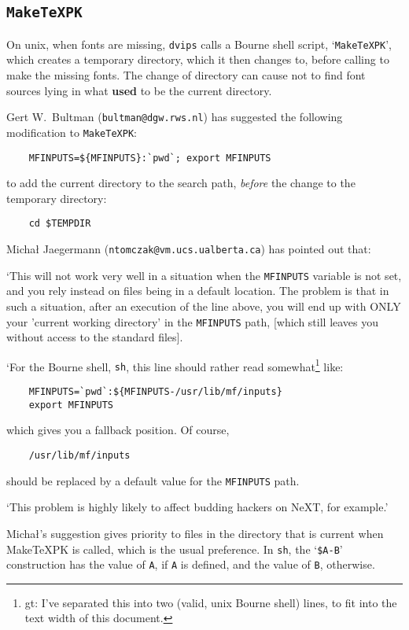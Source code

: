 \subsection{{\tt MakeTeXPK}}\label{sub:maketexpk}

On {\sc unix}, when fonts are missing,
{\tt dvips} calls a Bourne shell script, `{\tt MakeTeXPK}',
which creates a temporary directory, which it then changes to,
before calling \MF{} to make the missing fonts.
The change of directory can cause \MF{} not to find font sources
lying in what {\bf used} to be the current directory.

Gert W.~{\sc Bultman} ({\tt bultman@dgw.rws.nl}) has suggested the
following modification to {\tt MakeTeXPK\/}:
\begin{verbatim}
    MFINPUTS=${MFINPUTS}:`pwd`; export MFINPUTS
\end{verbatim}
to add the current directory to the search path, {\em before\/} the
change to the temporary directory:
\begin{verbatim}
    cd $TEMPDIR
\end{verbatim}

Micha{\l} {\sc Jaegermann} ({\tt ntomczak@vm.ucs.ualberta.ca})
has pointed out that:

`This will not work very well in a situation when the {\tt MFINPUTS} variable
is not set, and you rely instead on \MF{} files being in a default
location.  The problem is that in such a situation, after an execution
of the line above, you will end up with ONLY your 'current working
directory' in the {\tt MFINPUTS} path, [which still leaves you
without access to the standard \MF{} files].

`For the Bourne shell, {\tt sh}, this line should rather read
somewhat\footnote
{gt:  I've separated this into two (valid, unix Bourne shell) lines,
to fit into the text width of this document.}
like:
\begin{verbatim}
    MFINPUTS=`pwd`:${MFINPUTS-/usr/lib/mf/inputs}
    export MFINPUTS
\end{verbatim}
which gives you a fallback position.  Of course,
\begin{verbatim}
    /usr/lib/mf/inputs
\end{verbatim}
should be replaced by a default value for the {\tt MFINPUTS} path.

`This problem is highly likely to affect budding \MF{} hackers
on {\sf NeXT}, for example.'

Micha{\l}'s suggestion gives priority to \MF{} files in the directory that
is current when MakeTeXPK is called, which is the usual preference.
In {\tt sh}, the `{\tt \${A-B}}' construction has the value of {\tt A},
if {\tt A} is defined, and the value of {\tt B}, otherwise.

